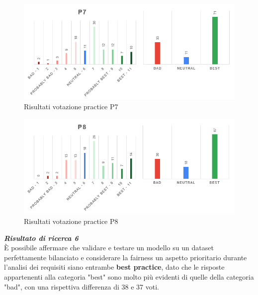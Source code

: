 \begin{figure}[h!]
    \centering
    \includegraphics[width=1\textwidth]{figure/data-analysis3/P7.png}
    \caption{Risultati votazione practice P7}
    \label{im-a-prac-8}
\end{figure}
\begin{figure}[h!]
    \centering
    \includegraphics[width=1\textwidth]{figure/data-analysis3/P8.png}
    \caption{Risultati votazione practice P8}
    \label{im-a-prac-9}
\end{figure}

\begin{center}
    \begin{tcolorbox}[width=400pt, colframe=black, colback=Gray!30]
		\begin{minipage}{\textwidth}
			\textit{\faKey \textbf{ Risultato di ricerca 6}}\\
			È possibile affermare che validare e testare un modello su un dataset perfettamente bilanciato e considerare la fairness un aspetto prioritario durante l'analisi dei requisiti siano entrambe \textbf{best practice}, dato che le risposte appartenenti alla categoria "best" sono molto più evidenti di quelle della categoria "bad", con una rispettiva differenza di 38 e 37 voti.
		\end{minipage}
	\end{tcolorbox}
\end{center}

